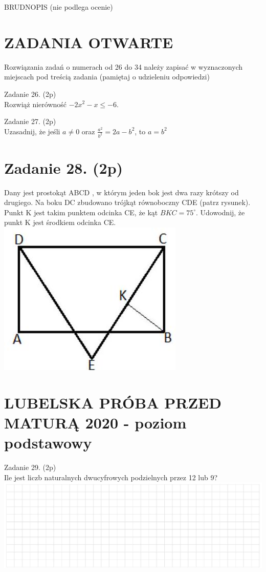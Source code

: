 \documentclass[10pt]{article}
\begin{document}
BRUDNOPIS (nie podlega ocenie)

\section*{ZADANIA OTWARTE}
Rozwiązania zadań o numerach od 26 do 34 należy zapisać w wyznaczonych miejscach pod treścią zadania (pamiętaj o udzieleniu odpowiedzi)

Zadanie 26. (2p)\\
Rozwiąż nierówność \(-2 x^{2}-x \leq-6\).

Zadanie 27. (2p)\\
Uzasadnij, że jeśli \(a \neq 0\) oraz \(\frac{a^{2}}{b^{2}}=2 a-b^{2}\), to \(a=b^{2}\)

\section*{Zadanie 28. (2p)}
Dany jest prostokąt ABCD , w którym jeden bok jest dwa razy krótszy od drugiego. Na boku DC zbudowano trójkąt równoboczny CDE (patrz rysunek). Punkt K jest takim punktem odcinka CE, że kąt \(B K C=75^{\circ}\). Udowodnij, że punkt K jest środkiem odcinka CE.\\
\includegraphics[max width=\textwidth, center]{2024_11_21_e376e4ee4a8b7ab03731g-09}

\section*{LUBELSKA PRÓBA PRZED MATURĄ 2020 - poziom podstawowy}
Zadanie 29. (2p)\\
Ile jest liczb naturalnych dwucyfrowych podzielnych przez 12 lub 9?\\
\includegraphics[max width=\textwidth, center]{2024_11_21_e376e4ee4a8b7ab03731g-10(1)}
\end{document}
